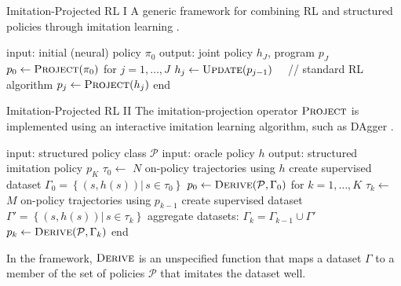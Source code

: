 \begin{frame}[fragile]{Imitation-Projected RL I}
A generic framework for combining RL and structured policies through imitation learning \citep{Verma_Le_Yue_Chaudhuri_2019}.


\begin{algorithm}[caption={Imitation-Projected Programmatic Reinforcement Learning}]
 input: initial (neural) policy $\pi_0$
 output: joint policy $h_J$, program $p_J$
 $p_0 \leftarrow \textsc{Project}(\pi_0)$
 for $j = 1, \dots, J$
   $h_j \leftarrow \textsc{Update}(p_{j-1}) \quad$ // standard RL algorithm
   $p_j \leftarrow \textsc{Project}(h_j)$
 end
\end{algorithm}
\end{frame}

\begin{frame}[fragile]{Imitation-Projected RL II}
The imitation-projection operator $\textsc{Project}$ is implemented using an interactive imitation learning algorithm, such as DAgger \citep{ross2011reduction}.

\begin{algorithm}[caption={$\textsc{Project}$: imitation learning}]
 input: structured policy class $\mathcal{P}$
 input: oracle policy $h$
 output: structured imitation policy $p_K$
 $\tau_0 \leftarrow $ $N$ on-policy trajectories using $h$
 create supervised dataset $\Gamma_0 = \left\{\left(s, h(s)\right) |\, s \in \tau_0 \right\}$
 $p_0 \leftarrow \textsc{Derive}(\mathcal{P}, \Gamma_0)$
 for $k = 1, \dots, K$
   $\tau_k \leftarrow $ $M$ on-policy trajectories using $p_{k-1}$
   create supervised dataset $\Gamma' = \left\{\left(s, h(s)\right) |\, s \in \tau_k \right\}$
   aggregate datasets: $\Gamma_k = \Gamma_{k-1} \cup \Gamma' \quad$
   $p_k \leftarrow \textsc{Derive}(\mathcal{P}, \Gamma_k)$
 end
\end{algorithm}

In the framework, $\textsc{Derive}$ is an unspecified function that maps a dataset $\Gamma$ to a member of the set of policies $\mathcal{P}$ that imitates the dataset well.


\end{frame}


